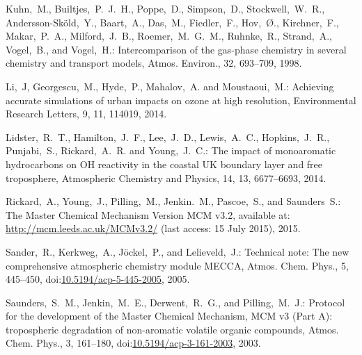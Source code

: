 \documentclass[acpd, online, hvmath]{copernicus}
\begin{document}
\begin{thebibliography}{34}
  Kuhn,~M., Builtjes,~P.~J.~H., Poppe,~D., Simpson,~D.,
  Stockwell,~W.~R., Andersson-Sk{\"o}ld,~Y., Baart,~A., Das,~M.,
  Fiedler,~F., Hov,~{\O}., Kirchner,~F., Makar,~P.~A., Milford,~J.~B.,
  Roemer,~M.~G.~M., Ruhnke,~R., Strand,~A., Vogel,~B., and Vogel,~H.:
  {Intercomparison of the gas-phase chemistry in several chemistry and
    transport models}, Atmos. Environ., 32, 693--709, 1998.

    
  Li,~J, Georgescu,~M., Hyde,~P., Mahalov,~A. and Moustaoui,~M.: Achieving accurate simulations of urban impacts on ozone at high resolution, Environmental Research Letters, 9, 11, 114019, 2014.
  
   Lidster,~R.~T., Hamilton,~J.~F., Lee,~J.~D., Lewis,~A.~C., Hopkins,~J.~R., Punjabi,~S., Rickard,~A.~R. and Young,~J.~C.: The impact of monoaromatic hydrocarbons on OH reactivity in the coastal UK boundary layer and free troposphere, Atmospheric Chemistry and Physics, 14, 13, 6677--6693, 2014.

 Rickard,~A., Young,~J., Pilling,~M., Jenkin.~M., Pascoe,~S., and Saunders~S.: {The Master Chemical Mechanism Version MCM v3.2}, available at: \url{http://mcm.leeds.ac.uk/MCMv3.2/} (last access: 15 July 2015), 2015.


 Sander,~R., Kerkweg,~A., J\"{o}ckel,~P.,
  and Lelieveld,~J.: Technical note: The new comprehensive atmospheric
  chemistry module MECCA, Atmos. Chem. Phys., 5, 445--450,
  doi:\href{http://dx.doi.org/10.5194/acp-5-445-2005}{10.5194/acp-5-445-2005}, 2005.



 Saunders,~S.~M., Jenkin,~M.~E.,
  Derwent,~R.~G., and Pilling,~M.~J.: Protocol for the development of
  the Master Chemical Mechanism, MCM v3 (Part A): tropospheric
  degradation of non-aromatic volatile organic compounds,
  Atmos. Chem. Phys., 3, 161--180,
doi:\href{http://dx.doi.org/10.5194/acp-3-161-2003}{10.5194/acp-3-161-2003},
  2003.




\end{thebibliography}
\end{document}
